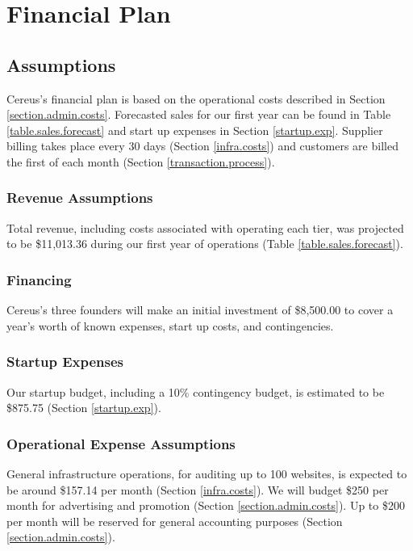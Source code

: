 {\let\cleardoublepage\relax \chapter{Financial Plan}}

\section{Assumptions}

Cereus's financial plan is based on the operational costs described in Section \ref{section.admin.costs}. Forecasted sales for our first year can be found in Table \ref{table.sales.forecast} and start up expenses in Section \ref{startup.exp}. Supplier billing takes place every 30 days (Section \ref{infra.costs}) and customers are billed the first of each month (Section \ref{transaction.process}).

\subsection{Revenue Assumptions}

Total revenue, including costs associated with operating each tier, was projected to be \$11,013.36 during our first year of operations (Table \ref{table.sales.forecast}).

\subsection{Financing}

Cereus's three founders will make an initial investment of \$8,500.00 to cover a year's worth of known expenses, start up costs, and contingencies.

\subsection{Startup Expenses}

Our startup budget, including a 10\% contingency budget, is estimated to be \$875.75 (Section \ref{startup.exp}).

\subsection{Operational Expense Assumptions}

General infrastructure operations, for auditing up to 100 websites, is expected to be around \$157.14 per month (Section \ref{infra.costs}). We will budget \$250 per month for advertising and promotion (Section \ref{section.admin.costs}). Up to \$200 per month will be reserved for general accounting purposes (Section \ref{section.admin.costs}).

